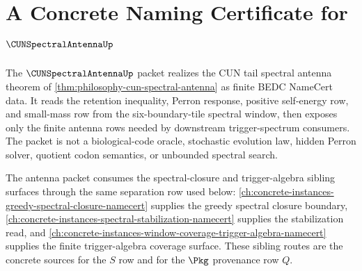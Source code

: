 \chapter{A Concrete Naming Certificate for $\CUNSpectralAntennaUp$}
\label{ch:concrete-instances-cun-spectral-antenna-namecert}

The $\CUNSpectralAntennaUp$ packet realizes the CUN tail spectral antenna theorem of \autoref{thm:philosophy-cun-spectral-antenna} as finite BEDC NameCert data. It reads the retention inequality, Perron response, positive self-energy row, and small-mass row from the six-boundary-tile spectral window, then exposes only the finite antenna rows needed by downstream trigger-spectrum consumers. The packet is not a biological-code oracle, stochastic evolution law, hidden Perron solver, quotient codon semantics, or unbounded spectral search.

The antenna packet consumes the spectral-closure and trigger-algebra sibling surfaces through the same separation row used below: \autoref{ch:concrete-instances-greedy-spectral-closure-namecert} supplies the greedy spectral closure boundary, \autoref{ch:concrete-instances-spectral-stabilization-namecert} supplies the stabilization read, and \autoref{ch:concrete-instances-window-coverage-trigger-algebra-namecert} supplies the finite trigger-algebra coverage surface. These sibling routes are the concrete sources for the $S$ row and for the $\Pkg$ provenance row $Q$.

